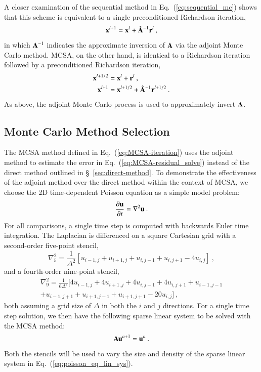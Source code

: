 \documentclass[preprint,12pt]{elsarticle}
\newcommand{\vA}{\ensuremath{\ve{A}}}
\newcommand{\vx}{\ensuremath{\ve{x}}}
\newcommand{\vr}{\ensuremath{\ve{r}}}
\newcommand{\vu}{\ensuremath{\ve{u}}}
\begin{document}
A closer examination of the sequential method in Eq.~(\ref{eq:sequential_mc})
shows that this scheme is equivalent to a single preconditioned Richardson
iteration,
\begin{equation}
  \vx^{l+1} = \vx^{l} + \hat{\vA}^{-1}\vr^l\:,
\end{equation}
in which $\vA^{-1}$ indicates the approximate inversion of $\vA$ via the
adjoint Monte Carlo method.  MCSA, on the other hand, is identical to a
Richardson iteration followed by a preconditioned Richardson iteration,
\begin{align}
  \vx^{l+1/2} &= \vx^{l} + \vr^{l}\:,\\
  \vx^{l+1} &= \vx^{l+1/2} + \hat{\vA}^{-1}\vr^{l+1/2}\:.
\end{align}
As above, the adjoint Monte Carlo process is used to approximately invert
$\vA$.


\subsection{Monte Carlo Method Selection}

The MCSA method defined in Eq.~(\ref{eq:MCSA-iteration}) uses the adjoint
method to estimate the error in Eq.~(\ref{eq:MCSA-residual_solve}) instead of
the direct method outlined in \S~\ref{sec:direct-method}. To demonstrate the
effectiveness of the adjoint method over the direct method within the context
of MCSA, we choose the 2D time-dependent Poisson equation as a
simple model problem:
\begin{equation}
  \frac{\partial \vu}{\partial t} = \nabla^2 \vu\:.
  \label{eq:poisson_equation}
\end{equation}
For all comparisons, a single time step is computed with backwards Euler time
integration. The Laplacian is differenced on a square Cartesian grid with a
second-order five-point stencil,
\begin{equation}
  \nabla^2_5 = \frac{1}{\Delta^2}[u_{i-1,j} + u_{i+1,j} + u_{i,j-1} +
    u_{i,j+1} - 4 u_{i,j}]\:,
  \label{eq:five_point_stencil}
\end{equation}
and a fourth-order nine-point stencil,
\begin{multline}
  \nabla^2_9 = \frac{1}{6\Delta^2}[4 u_{i-1,j} + 4 u_{i+1,j} + 4
    u_{i,j-1} + 4 u_{i,j+1} + u_{i-1,j-1}\\ + u_{i-1,j+1} +
    u_{i+1,j-1} + u_{i+1,j+1} - 20 u_{i,j}]\:,
  \label{eq:nine_point_stencil}
\end{multline}
both assuming a grid size of $\Delta$ in both the $i$ and $j$ directions. For
a single time step solution, we then have the following sparse linear system
to be solved with the MCSA method:
\begin{equation}
  \vA \vu^{n+1} = \vu^n\:.
  \label{eq:poisson_eq_lin_sys}
\end{equation}
Both the stencils will be used to vary the size and density of the sparse
linear system in Eq.~(\ref{eq:poisson_eq_lin_sys}).
\end{document}
